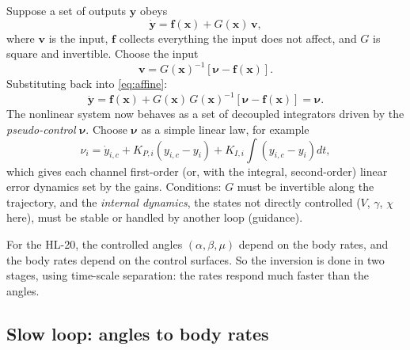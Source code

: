 \documentclass[11pt]{report}
\numberwithin{equation}{chapter}
\newcommand{\vb}[1]{\bm{#1}}
\begin{document}
Suppose a set of outputs $\vb y$ obeys
\begin{equation}
  \dot{\vb y} = \vb f(\vb x) + G(\vb x)\,\vb v,
  \label{eq:affine}
\end{equation}
where $\vb v$ is the input, $\vb f$ collects everything the input does not affect, and $G$ is
square and invertible. Choose the input
\begin{equation}
  \vb v = G(\vb x)^{-1}\left[\vb\nu - \vb f(\vb x)\right].
\end{equation}
Substituting back into \cref{eq:affine}:
\begin{equation}
  \dot{\vb y} = \vb f(\vb x) + G(\vb x)\,G(\vb x)^{-1}\left[\vb\nu - \vb f(\vb x)\right] = \vb\nu .
\end{equation}
The nonlinear system now behaves as a set of decoupled integrators driven by the
\emph{pseudo-control} $\vb\nu$. Choose $\vb\nu$ as a simple linear law, for example
\begin{equation}
  \nu_i = \dot y_{i,c} + K_{P,i}\left(y_{i,c} - y_i\right) + K_{I,i}\int\left(y_{i,c} - y_i\right)dt,
\end{equation}
which gives each channel first-order (or, with the integral, second-order) linear error
dynamics set by the gains. Conditions: $G$ must be invertible along the trajectory, and the
\emph{internal dynamics}, the states not directly controlled ($V$, $\gamma$, $\chi$ here), must
be stable or handled by another loop (guidance).

For the HL-20, the controlled angles $(\alpha,\beta,\mu)$ depend on the body rates, and the
body rates depend on the control surfaces. So the inversion is done in two stages, using
time-scale separation: the rates respond much faster than the angles.

\subsection{Slow loop: angles to body rates}
\end{document}

